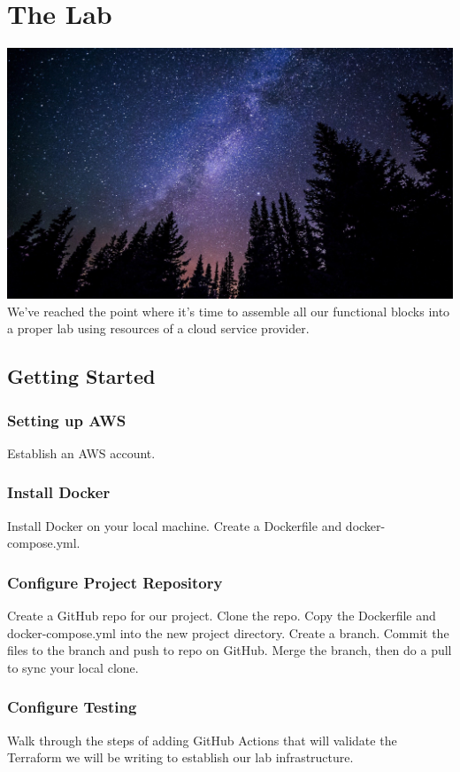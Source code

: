 \chapter{The Lab}

\includegraphics[scale=0.20]{images/milky-way-984050_1920.jpg}
\justify{}
We've reached the point where it's time to assemble all our functional
blocks into a proper lab using resources of a cloud service provider.

\section{Getting Started}

\subsection{Setting up AWS}
\justify{}
Establish an AWS account.

\subsection{Install Docker}
\justify{}
Install Docker on your local machine. Create a Dockerfile and
docker-compose.yml.

\subsection{Configure Project Repository}
\justify{}
Create a GitHub repo for our project. Clone the repo. Copy the
Dockerfile and docker-compose.yml into the new project directory. Create
a branch. Commit the files to the branch and push to repo on GitHub.
Merge the branch, then do a pull to sync your local clone.

\subsection{Configure Testing}
\justify{}
Walk through the steps of adding GitHub Actions that will validate the
Terraform we will be writing to establish our lab infrastructure.

